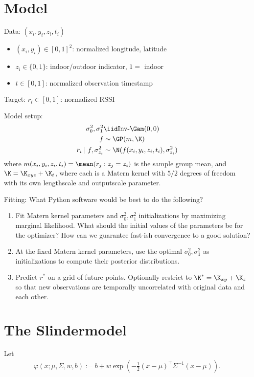 \documentclass{article}
\begin{document}
\section{Model}

Data: $(x_i, y_i, z_i, t_i)$
\begin{itemize}
    \item $(x_i, y_i) \in [0,1]^2$: normalized longitude, latitude
    \item $z_i \in \{0, 1\}$: indoor/outdoor indicator, $1 = $ indoor
    \item $t \in [0, 1]$: normalized observation timestamp
\end{itemize}
Target: $r_i \in [0, 1]$: normalized RSSI

\medskip

Model setup:
\begin{align*}
    \sigma^2_0, \sigma^2_1 &\iid \text{Inv-}\Gam(0, 0) \\
    f &\sim \GP(m, \K) \\
    r_i \mid f, \sigma^2_{z_i} &\sim \N(f(x_i, y_i, z_i, t_i), \sigma^2_{z_i})
\end{align*}
where $m(x_i, y_i, z_i, t_i) = \mean(r_j : z_j = z_i)$ is the sample group mean, and $\K = \K_{xyz} + \K_t$, where each is a Matern kernel with $5/2$ degrees of freedom with its own lengthscale and outputscale parameter.

\medskip

Fitting: What Python software would be best to do the following?
\begin{enumerate}
    \item Fit Matern kernel parameters and $\sigma_0^2, \sigma_1^2$ initializations by maximizing marginal likelihood. What should the initial values of the parameters be for the optimizer? How can we guarantee fast-ish convergence to a good solution?

    \item At the fixed Matern kernel parameters, use the optimal $\sigma_0^2, \sigma_1^2$ as initializations to compute their posterior distributions.

    \item Predict $r^*$ on a grid of future points. Optionally restrict to $\K^* = \K_{xy} + \K_z$ so that new observations are temporally uncorrelated with original data and each other.
\end{enumerate}

\section{The Slindermodel}
Let
\begin{align*}
    \varphi(x; \mu, \Sigma, w, b) := b + w \exp\left(-\frac{1}{2} (x - \mu)^\top \Sigma^{-1} (x - \mu) \right).
\end{align*}
\end{document}
